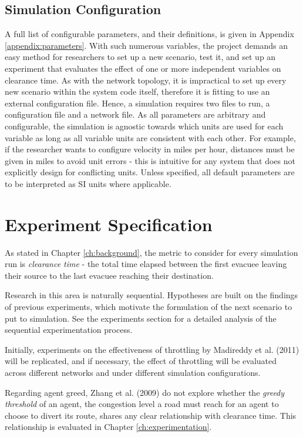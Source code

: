 \subsection{Simulation Configuration}
A full list of configurable parameters, and their definitions, is given in Appendix \ref{appendix:parameters}. With such numerous variables, the project demands an easy method for researchers to set up a new scenario, test it, and set up an experiment that evaluates the effect of one or more independent variables on clearance time. As with the network topology, it is impractical to set up every new scenario within the system code itself, therefore it is fitting to use an external configuration file. Hence, a simulation requires two files to run, a configuration file and a network file. As all parameters are arbitrary and configurable, the simulation is agnostic towards which units are used for each variable as long as all variable units are consistent with each other. For example, if the researcher wants to configure velocity in miles per hour, distances must be given in miles to avoid unit errors - this is intuitive for any system that does not explicitly design for conflicting units. Unless specified, all default parameters are to be interpreted as SI units where applicable.

\section{Experiment Specification}

As stated in Chapter \ref{ch:background}, the metric to consider for every simulation run is \textit{clearance time} - the total time elapsed between the first evacuee leaving their source to the last evacuee reaching their destination.

Research in this area is naturally sequential. Hypotheses are built on the findings of previous experiments, which motivate the formulation of the next scenario to put to simulation. See the experiments section for a detailed analysis of the sequential experimentation process.

Initially, experiments on the effectiveness of throttling by Madireddy et al. (2011) will be replicated, and if necessary, the effect of throttling will be evaluated across different networks and under different simulation configurations.

Regarding agent greed, Zhang et al. (2009) do not explore whether the \textit{greedy threshold} of an agent, the congestion level a road must reach for an agent to choose to divert its route, shares any clear relationship with clearance time. This relationship is evaluated in Chapter \ref{ch:experimentation}.
